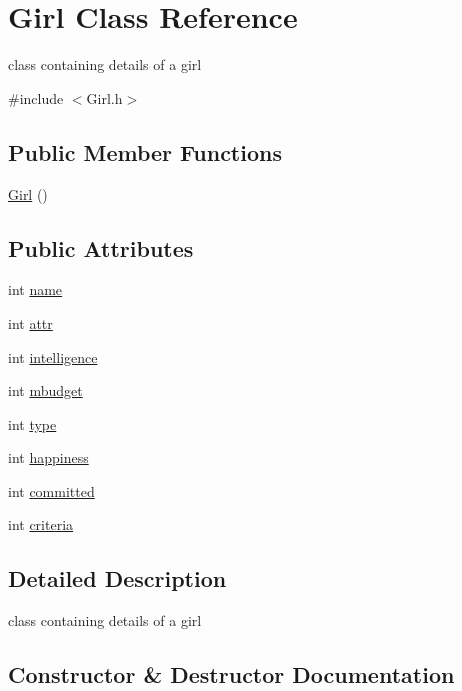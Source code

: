 \hypertarget{classGirl}{}\section{Girl Class Reference}
\label{classGirl}


class containing details of a girl  




{\ttfamily \#include $<$Girl.\+h$>$}

\subsection*{Public Member Functions}
\begin{DoxyCompactItemize}
\item 
\hyperlink{classGirl_ab1997d704355d9168ea97aea12c7727a}{Girl} ()
\end{DoxyCompactItemize}
\subsection*{Public Attributes}
\begin{DoxyCompactItemize}
\item 
int \hyperlink{classGirl_ae05b0ddae0fdca022bd74a8060421b9c}{name}
\item 
int \hyperlink{classGirl_a136078d5111d5dc1fef6a35f84b38c01}{attr}
\item 
int \hyperlink{classGirl_a751f8b9d8f1ba139d3f512eb198c16f4}{intelligence}
\item 
int \hyperlink{classGirl_a81c1cf79fd9153b32d73d0e1e34255fa}{mbudget}
\item 
int \hyperlink{classGirl_ac0242bb0ae7c23f69a75537437f76586}{type}
\item 
int \hyperlink{classGirl_a50337447735a8f518fd817338d04d5b9}{happiness}
\item 
int \hyperlink{classGirl_ac5829e7ec762f1a3fb7484acfd6c1680}{committed}
\item 
int \hyperlink{classGirl_a77bea2ccde6f82919fece9398519f85e}{criteria}
\end{DoxyCompactItemize}


\subsection{Detailed Description}
class containing details of a girl 

\subsection{Constructor \& Destructor Documentation}
